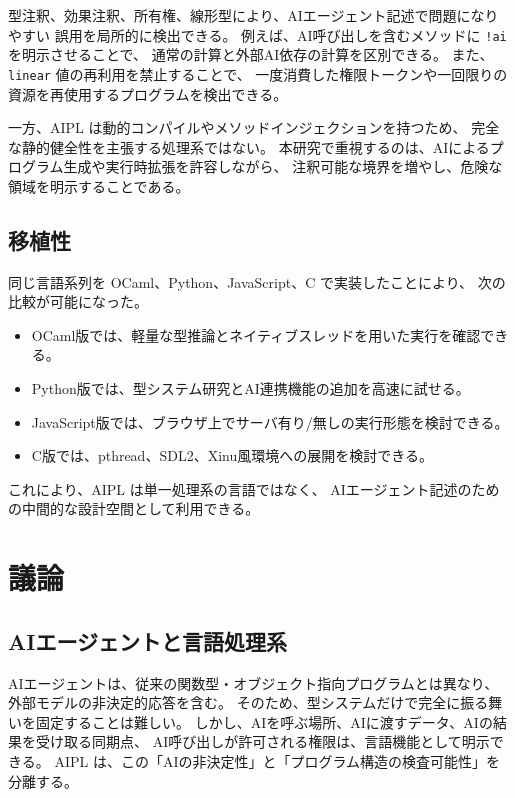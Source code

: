 \documentclass[11pt,a4paper,uplatex,dvipdfmx]{jsarticle}
\newcommand{\code}[1]{\texttt{#1}}
\begin{document}
型注釈、効果注釈、所有権、線形型により、AIエージェント記述で問題になりやすい
誤用を局所的に検出できる。
例えば、AI呼び出しを含むメソッドに \code{!{ai}} を明示させることで、
通常の計算と外部AI依存の計算を区別できる。
また、\code{linear} 値の再利用を禁止することで、
一度消費した権限トークンや一回限りの資源を再使用するプログラムを検出できる。

一方、AIPL は動的コンパイルやメソッドインジェクションを持つため、
完全な静的健全性を主張する処理系ではない。
本研究で重視するのは、AIによるプログラム生成や実行時拡張を許容しながら、
注釈可能な境界を増やし、危険な領域を明示することである。

\subsection{移植性}

同じ言語系列を OCaml、Python、JavaScript、C で実装したことにより、
次の比較が可能になった。

\begin{itemize}
  \item OCaml版では、軽量な型推論とネイティブスレッドを用いた実行を確認できる。
  \item Python版では、型システム研究とAI連携機能の追加を高速に試せる。
  \item JavaScript版では、ブラウザ上でサーバ有り/無しの実行形態を検討できる。
  \item C版では、pthread、SDL2、Xinu風環境への展開を検討できる。
\end{itemize}

これにより、AIPL は単一処理系の言語ではなく、
AIエージェント記述のための中間的な設計空間として利用できる。

\section{議論}

\subsection{AIエージェントと言語処理系}

AIエージェントは、従来の関数型・オブジェクト指向プログラムとは異なり、
外部モデルの非決定的応答を含む。
そのため、型システムだけで完全に振る舞いを固定することは難しい。
しかし、AIを呼ぶ場所、AIに渡すデータ、AIの結果を受け取る同期点、
AI呼び出しが許可される権限は、言語機能として明示できる。
AIPL は、この「AIの非決定性」と「プログラム構造の検査可能性」を分離する。
\end{document}
